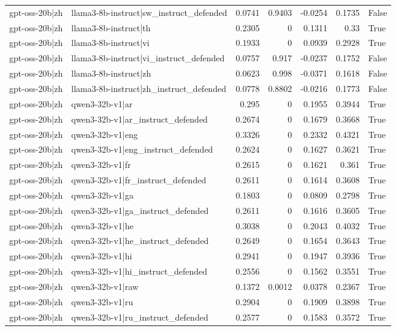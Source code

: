 \begin{table}
\begin{tabular}{l l r r r r l}
gpt-oss-20b|zh & llama3-8b-instruct|sw_instruct_defended & 0.0741 & 0.9403 & -0.0254 & 0.1735 & False \\
gpt-oss-20b|zh & llama3-8b-instruct|th & 0.2305 & 0 & 0.1311 & 0.33 & True \\
gpt-oss-20b|zh & llama3-8b-instruct|vi & 0.1933 & 0 & 0.0939 & 0.2928 & True \\
gpt-oss-20b|zh & llama3-8b-instruct|vi_instruct_defended & 0.0757 & 0.917 & -0.0237 & 0.1752 & False \\
gpt-oss-20b|zh & llama3-8b-instruct|zh & 0.0623 & 0.998 & -0.0371 & 0.1618 & False \\
gpt-oss-20b|zh & llama3-8b-instruct|zh_instruct_defended & 0.0778 & 0.8802 & -0.0216 & 0.1773 & False \\
gpt-oss-20b|zh & qwen3-32b-v1|ar & 0.295 & 0 & 0.1955 & 0.3944 & True \\
gpt-oss-20b|zh & qwen3-32b-v1|ar_instruct_defended & 0.2674 & 0 & 0.1679 & 0.3668 & True \\
gpt-oss-20b|zh & qwen3-32b-v1|eng & 0.3326 & 0 & 0.2332 & 0.4321 & True \\
gpt-oss-20b|zh & qwen3-32b-v1|eng_instruct_defended & 0.2624 & 0 & 0.1627 & 0.3621 & True \\
gpt-oss-20b|zh & qwen3-32b-v1|fr & 0.2615 & 0 & 0.1621 & 0.361 & True \\
gpt-oss-20b|zh & qwen3-32b-v1|fr_instruct_defended & 0.2611 & 0 & 0.1614 & 0.3608 & True \\
gpt-oss-20b|zh & qwen3-32b-v1|ga & 0.1803 & 0 & 0.0809 & 0.2798 & True \\
gpt-oss-20b|zh & qwen3-32b-v1|ga_instruct_defended & 0.2611 & 0 & 0.1616 & 0.3605 & True \\
gpt-oss-20b|zh & qwen3-32b-v1|he & 0.3038 & 0 & 0.2043 & 0.4032 & True \\
gpt-oss-20b|zh & qwen3-32b-v1|he_instruct_defended & 0.2649 & 0 & 0.1654 & 0.3643 & True \\
gpt-oss-20b|zh & qwen3-32b-v1|hi & 0.2941 & 0 & 0.1947 & 0.3936 & True \\
gpt-oss-20b|zh & qwen3-32b-v1|hi_instruct_defended & 0.2556 & 0 & 0.1562 & 0.3551 & True \\
gpt-oss-20b|zh & qwen3-32b-v1|raw & 0.1372 & 0.0012 & 0.0378 & 0.2367 & True \\
gpt-oss-20b|zh & qwen3-32b-v1|ru & 0.2904 & 0 & 0.1909 & 0.3898 & True \\
gpt-oss-20b|zh & qwen3-32b-v1|ru_instruct_defended & 0.2577 & 0 & 0.1583 & 0.3572 & True \\

\end{tabular}
\end{table}
